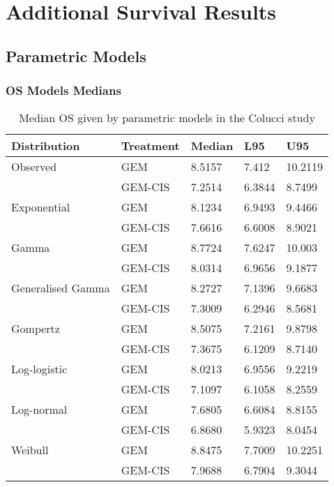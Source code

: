 \chapter{Additional Survival Results}\label{survivalResultsAppendix}

\section{Parametric Models}

\subsection{OS Models Medians}

\begin{table}
    \center
    \begin{tabular}{lllll}
    \hline
    Distribution      & Treatment & Median & L95    & U95     \\ \hline
    Observed          & GEM       & 8.5157 & 7.412  & 10.2119 \\
                      & GEM-CIS   & 7.2514 & 6.3844 & 8.7499  \\ \hline
    Exponential       & GEM       & 8.1234 & 6.9493 & 9.4466  \\
                      & GEM-CIS   & 7.6616 & 6.6008 & 8.9021  \\
    Gamma             & GEM       & 8.7724 & 7.6247 & 10.003  \\
                      & GEM-CIS   & 8.0314 & 6.9656 & 9.1877  \\
    Generalised Gamma & GEM       & 8.2727 & 7.1396 & 9.6683  \\
                      & GEM-CIS   & 7.3009 & 6.2946 & 8.5681  \\
    Gompertz          & GEM       & 8.5075 & 7.2161 & 9.8798  \\
                      & GEM-CIS   & 7.3675 & 6.1209 & 8.7140  \\
    Log-logistic      & GEM       & 8.0213 & 6.9556 & 9.2219  \\
                      & GEM-CIS   & 7.1097 & 6.1058 & 8.2559  \\
    Log-normal        & GEM       & 7.6805 & 6.6084 & 8.8155  \\
                      & GEM-CIS   & 6.8680 & 5.9323 & 8.0454  \\
    Weibull           & GEM       & 8.8475 & 7.7009 & 10.2251 \\
                      & GEM-CIS   & 7.9688 & 6.7904 & 9.3044  \\ \hline
    \end{tabular}
    \caption{Median OS given by parametric models in the Colucci study}
    \label{colucciModelMedians}
\end{table}


